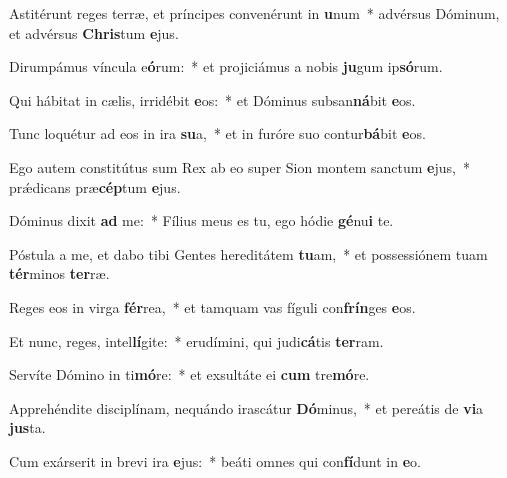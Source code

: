 \item Astitérunt reges terræ, et príncipes convenérunt in \textbf{u}num~* advérsus Dóminum, et advérsus \textbf{Chris}tum \textbf{e}jus.
\item Dirumpámus víncula e\textbf{ó}rum:~* et projiciámus a nobis \textbf{ju}gum ip\textbf{só}rum.
\item Qui hábitat in cælis, irridébit \textbf{e}os:~* et Dóminus subsan\textbf{ná}bit \textbf{e}os.
\item Tunc loquétur ad eos in ira \textbf{su}a,~* et in furóre suo contur\textbf{bá}bit \textbf{e}os.
\item Ego autem constitútus sum Rex ab eo super Sion montem sanctum \textbf{e}jus,~* prǽdicans præ\textbf{cép}tum \textbf{e}jus.
\item Dóminus dixit \textbf{ad} me:~* Fílius meus es tu, ego hódie \textbf{gé}nu\textbf{i} te.
\item Póstula a me, et dabo tibi Gentes hereditátem \textbf{tu}am,~* et possessiónem tuam \textbf{tér}minos \textbf{ter}ræ.
\item Reges eos in virga \textbf{fér}rea,~* et tamquam vas fíguli con\textbf{frín}ges \textbf{e}os.
\item Et nunc, reges, intel\textbf{lí}gite:~* erudímini, qui judi\textbf{cá}tis \textbf{ter}ram.
\item Servíte Dómino in ti\textbf{mó}re:~* et exsultáte ei \textbf{cum} tre\textbf{mó}re.
\item Apprehéndite disciplínam, nequándo irascátur \textbf{Dó}minus,~* et pereátis de \textbf{vi}a \textbf{jus}ta.
\item Cum exárserit in brevi ira \textbf{e}jus:~* beáti omnes qui con\textbf{fí}dunt in \textbf{e}o.
